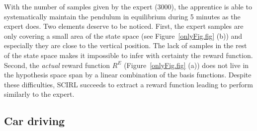 \documentclass{article}
\begin{document}
With the number of samples given by the expert (3000), the
apprentice is able to systematically maintain the pendulum in
equilibrium during 5 minutes as the expert does.
%
%
Two elements deserve to be noticed. First, the expert samples are
only covering a small area of the state space (see
Figure~\ref{onlyFig.fig} (b)) and especially they are close to the
vertical position. The lack of samples in the rest of the state
space makes it impossible to infer with certainty the reward
function. Second, the \textit{actual} reward function $R^E$
(Figure~\ref{onlyFig.fig} (a)) does not live in the hypothesis space
span by a linear combination of the basis functions. Despite these
difficulties, SCIRL succeeds to extract a reward function leading to
perform similarly to the expert. %

\subsection{Car driving}
\end{document}
